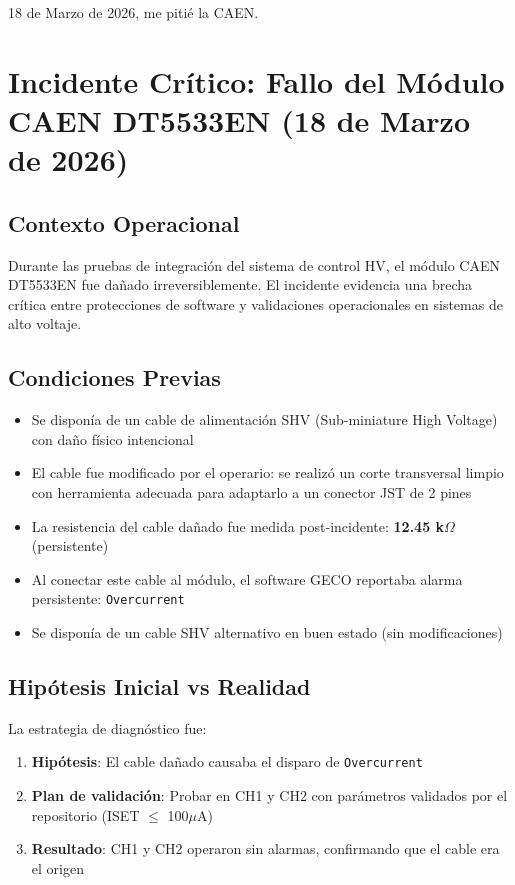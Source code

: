 \documentclass{article}
\begin{document}
18 de Marzo de 2026, me pitié la CAEN. 

\section{Incidente Crítico: Fallo del Módulo CAEN DT5533EN (18 de Marzo de 2026)}

\subsection{Contexto Operacional}

Durante las pruebas de integración del sistema de control HV, el módulo CAEN DT5533EN fue dañado irreversiblemente. El incidente evidencia una brecha crítica entre protecciones de software y validaciones operacionales en sistemas de alto voltaje.

\subsection{Condiciones Previas}

\begin{itemize}
    \item Se disponía de un cable de alimentación SHV (Sub-miniature High Voltage) con daño físico intencional
    \item El cable fue modificado por el operario: se realizó un corte transversal limpio con herramienta adecuada para adaptarlo a un conector JST de 2 pines
    \item La resistencia del cable dañado fue medida post-incidente: \textbf{12.45 k\(\Omega\)} (persistente)
    \item Al conectar este cable al módulo, el software GECO reportaba alarma persistente: \texttt{Overcurrent}
    \item Se disponía de un cable SHV alternativo en buen estado (sin modificaciones)
\end{itemize}

\subsection{Hipótesis Inicial vs Realidad}

La estrategia de diagnóstico fue:
\begin{enumerate}
    \item \textbf{Hipótesis}: El cable dañado causaba el disparo de \texttt{Overcurrent}
    \item \textbf{Plan de validación}: Probar en CH1 y CH2 con parámetros validados por el repositorio (ISET $\leq$ 100\(\mu\)A)
    \item \textbf{Resultado}: CH1 y CH2 operaron sin alarmas, confirmando que el cable era el origen
\end{enumerate}
\end{document}
